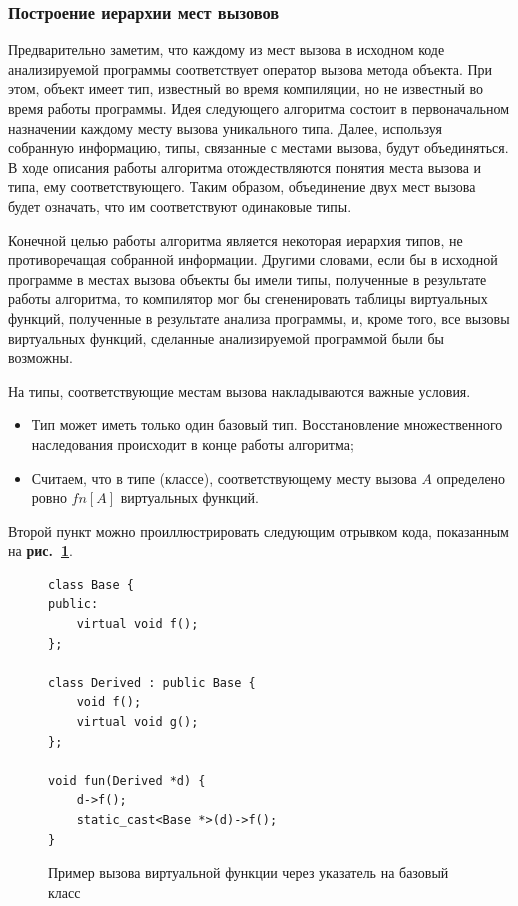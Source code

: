 \documentclass[a4paper,12pt,russian]{article}
\newcommand{\picref}[1]{\textbf{рис.~\ref{#1}}}
\begin{document}
\subsubsection{Построение иерархии мест вызовов}
Предварительно заметим, что каждому из мест вызова в исходном коде анализируемой программы соответствует оператор вызова метода объекта.
При этом, объект имеет тип, известный во время компиляции, но не известный во время работы программы.
Идея следующего алгоритма состоит в первоначальном назначении каждому месту вызова уникального типа.
Далее, используя собранную информацию, типы, связанные с местами вызова, будут объединяться.
В ходе описания работы алгоритма отождествляются понятия места вызова и типа, ему соответствующего.
Таким образом, объединение двух мест вызова будет означать, что им соответствуют одинаковые типы.

Конечной целью работы алгоритма является некоторая иерархия типов, не противоречащая собранной информации.
Другими словами, если бы в исходной программе в местах вызова объекты бы имели типы, полученные в результате работы алгоритма,
то компилятор мог бы сгененировать таблицы виртуальных функций, полученные в результате анализа программы, и, кроме того, все вызовы виртуальных функций,
сделанные анализируемой программой были бы возможны.

На типы, соответствующие местам вызова накладываются важные условия.
\begin{itemize}
\item Тип может иметь только один базовый тип. Восстановление множественного наследования происходит в конце работы алгоритма;
\item Считаем, что в типе (классе), соответствующему месту вызова $A$ определено ровно $fn[A]$ виртуальных функций.
\end{itemize}
Второй пункт можно проиллюстрировать следующим отрывком кода, показанным на \picref{min_vsize_ex_lst}.
\begin{figure}
\begin{lstlisting}
class Base {
public:
    virtual void f();
};

class Derived : public Base {
    void f();
    virtual void g();
};

void fun(Derived *d) {
    d->f();
    static_cast<Base *>(d)->f();
}
\end{lstlisting}
\caption{Пример вызова виртуальной функции через указатель на базовый класс}
\label{min_vsize_ex_lst}
\end{figure}
\end{document}
